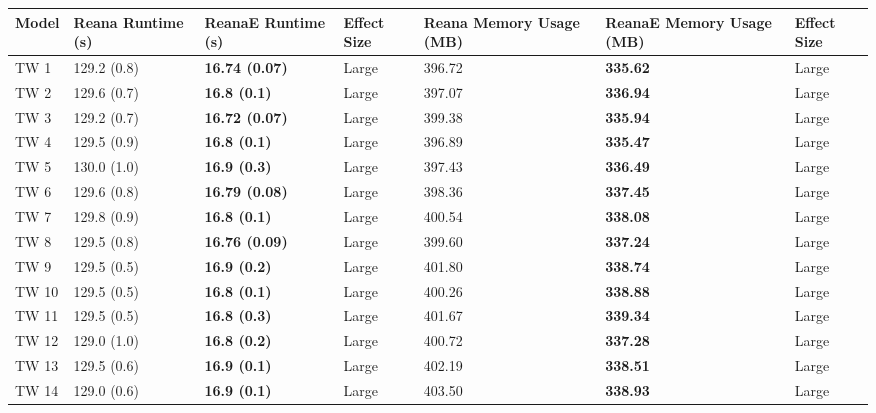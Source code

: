 \begin{tabular}{lllllll}
\toprule
 Model & Reana Runtime (s) &     ReanaE Runtime (s) & Effect Size & Reana Memory Usage (MB) & ReanaE Memory Usage (MB) & Effect Size \\
\midrule
  TW 1 &       129.2 (0.8) &  \textbf{16.74 (0.07)} &       Large &                  396.72 &          \textbf{335.62} &       Large \\
  TW 2 &       129.6 (0.7) &    \textbf{16.8 (0.1)} &       Large &                  397.07 &          \textbf{336.94} &       Large \\
  TW 3 &       129.2 (0.7) &  \textbf{16.72 (0.07)} &       Large &                  399.38 &          \textbf{335.94} &       Large \\
  TW 4 &       129.5 (0.9) &    \textbf{16.8 (0.1)} &       Large &                  396.89 &          \textbf{335.47} &       Large \\
  TW 5 &       130.0 (1.0) &    \textbf{16.9 (0.3)} &       Large &                  397.43 &          \textbf{336.49} &       Large \\
  TW 6 &       129.6 (0.8) &  \textbf{16.79 (0.08)} &       Large &                  398.36 &          \textbf{337.45} &       Large \\
  TW 7 &       129.8 (0.9) &    \textbf{16.8 (0.1)} &       Large &                  400.54 &          \textbf{338.08} &       Large \\
  TW 8 &       129.5 (0.8) &  \textbf{16.76 (0.09)} &       Large &                  399.60 &          \textbf{337.24} &       Large \\
  TW 9 &       129.5 (0.5) &    \textbf{16.9 (0.2)} &       Large &                  401.80 &          \textbf{338.74} &       Large \\
 TW 10 &       129.5 (0.5) &    \textbf{16.8 (0.1)} &       Large &                  400.26 &          \textbf{338.88} &       Large \\
 TW 11 &       129.5 (0.5) &    \textbf{16.8 (0.3)} &       Large &                  401.67 &          \textbf{339.34} &       Large \\
 TW 12 &       129.0 (1.0) &    \textbf{16.8 (0.2)} &       Large &                  400.72 &          \textbf{337.28} &       Large \\
 TW 13 &       129.5 (0.6) &    \textbf{16.9 (0.1)} &       Large &                  402.19 &          \textbf{338.51} &       Large \\
 TW 14 &       129.0 (0.6) &    \textbf{16.9 (0.1)} &       Large &                  403.50 &          \textbf{338.93} &       Large \\

\end{tabular}
